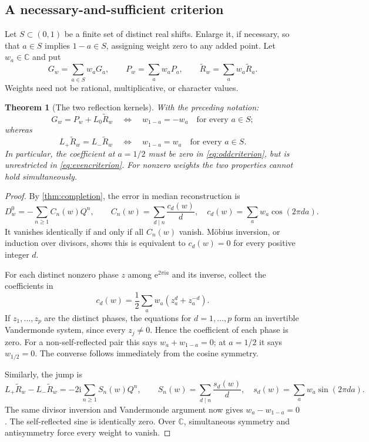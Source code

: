 \documentclass[11pt,a4paper]{article}
\numberwithin{equation}{section}
\newtheorem{theorem}{Theorem}[section]
\theoremstyle{definition}
\theoremstyle{remark}
\newcommand{\C}{\mathbb C}
\newcommand{\ii}{\mathrm i}
\newcommand{\e}{\mathrm e}
\newcommand{\wt}{\widetilde}
\begin{document}
\subsection{A necessary-and-sufficient criterion}
Let $S\subset(0,1)$ be a finite set of distinct real shifts. Enlarge it,
if necessary, so that $a\in S$ implies $1-a\in S$, assigning weight zero
to any added point. Let $w_a\in\C$ and put
\begin{equation}
 G_w=\sum_{a\in S}w_aG_a,
 \qquad P_w=\sum_aw_aP_a,
 \qquad \wt R_w=\sum_aw_a\wt R_a.
 \label{eq:weighted}
\end{equation}
Weights need not be rational, multiplicative, or character values.

\begin{theorem}[The two reflection kernels]
\label{thm:reflection}
With the preceding notation:
\begin{equation}
 G_w=P_w+L_0\wt R_w
 \quad\Longleftrightarrow\quad
 w_{1-a}=-w_a\quad\text{for every }a\in S;
 \label{eq:oddcriterion}
\end{equation}
whereas
\begin{equation}
 L_+\wt R_w=L_-\wt R_w
 \quad\Longleftrightarrow\quad
 w_{1-a}=w_a\quad\text{for every }a\in S.
 \label{eq:evencriterion}
\end{equation}
In particular, the coefficient at $a=1/2$ must be zero in
\eqref{eq:oddcriterion}, but is unrestricted in \eqref{eq:evencriterion}.
For nonzero weights the two properties cannot hold simultaneously.
\end{theorem}
\begin{proof}
By \cref{thm:completion}, the error in median reconstruction is
\begin{equation}
 D_w^0=-\sum_{n\geq1}C_n(w)Q^n,
 \qquad C_n(w)=\sum_{d\mid n}\frac{c_d(w)}d,
 \quad c_d(w)=\sum_aw_a\cos(2\pi da).
 \label{eq:cosdivisor}
\end{equation}
It vanishes identically if and only if all $C_n(w)$ vanish. M\"obius
inversion, or induction over divisors, shows this is equivalent to
$c_d(w)=0$ for every positive integer $d$.

For each distinct nonzero phase $z$ among $\e^{2\pi\ii a}$ and its
inverse, collect the coefficients in
\[
 c_d(w)=\frac12\sum_aw_a(z_a^d+z_a^{-d}).
\]
If $z_1,\ldots,z_p$ are the distinct phases, the equations for
$d=1,\ldots,p$ form an invertible Vandermonde system, since every
$z_j\ne0$. Hence the coefficient of each phase is zero. For a
non-self-reflected pair this says $w_a+w_{1-a}=0$; at $a=1/2$ it says
$w_{1/2}=0$. The converse follows immediately from the cosine symmetry.

Similarly, the jump is
\begin{equation}
 L_+\wt R_w-L_-\wt R_w
 =-2\ii\sum_{n\geq1}S_n(w)Q^n,
 \qquad S_n(w)=\sum_{d\mid n}\frac{s_d(w)}d,
 \quad s_d(w)=\sum_aw_a\sin(2\pi da).
 \label{eq:sindivisor}
\end{equation}
The same divisor inversion and Vandermonde argument now gives
$w_a-w_{1-a}=0$. The self-reflected sine is identically zero. Over
$\C$, simultaneous symmetry and antisymmetry force every weight to
vanish.
\end{proof}
\end{document}
